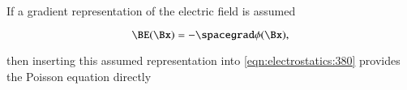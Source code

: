 %
%

If a gradient representation of the electric field is assumed

\begin{dmath}\label{eqn:electrostatics_electricPotential:561}
\BE(\Bx) = -\spacegrad \phi(\Bx),
\end{dmath}

then
inserting
this assumed representation into \cref{eqn:electrostatics:380} provides the
Poisson equation directly



